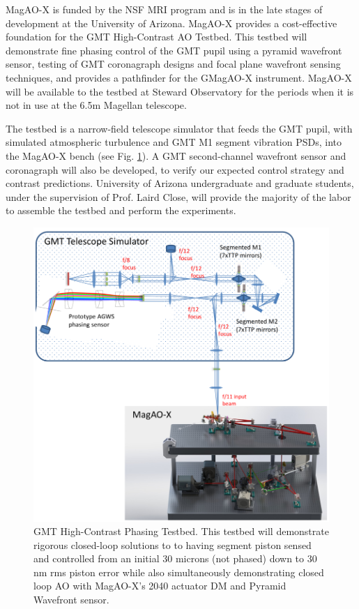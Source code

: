 \documentclass[12pt,preprint]{aastex}
\begin{document}
MagAO-X is funded by the NSF MRI program and is in the late stages of development at the University of Arizona. MagAO-X provides a cost-effective foundation for the GMT High-Contrast AO Testbed. This testbed will demonstrate fine phasing control of the GMT pupil using a pyramid wavefront sensor, testing of GMT coronagraph designs and focal plane wavefront sensing techniques, and provides a pathfinder for the GMagAO-X instrument. MagAO-X will be available to the testbed at Steward Observatory for the periods when it is not in use at the 6.5m Magellan telescope. 

The testbed is a narrow-field telescope simulator that feeds the GMT pupil, with simulated atmospheric turbulence and GMT M1 segment vibration PSDs, into the MagAO-X bench (see Fig. \ref{fig:testbed}). A GMT second-channel wavefront sensor and coronagraph will also be developed, to verify our expected control strategy and contrast predictions. University of Arizona undergraduate and graduate students, under the supervision of Prof. Laird Close, will provide the majority of the labor to assemble the testbed and perform the experiments.
 
 \begin{figure} [h!]
\centering
\includegraphics[width=5in]{figures/Testbed_figure.png}
\caption{GMT High-Contrast Phasing Testbed. This testbed will demonstrate rigorous closed-loop solutions to to having segment piston sensed and controlled from an initial 30 microns (not phased) down to 30 nm rms piston error while also simultaneously demonstrating closed loop AO with MagAO-X's 2040 actuator DM and Pyramid Wavefront sensor.  \label{fig:testbed}}
\end{figure}
 
\end{document}
